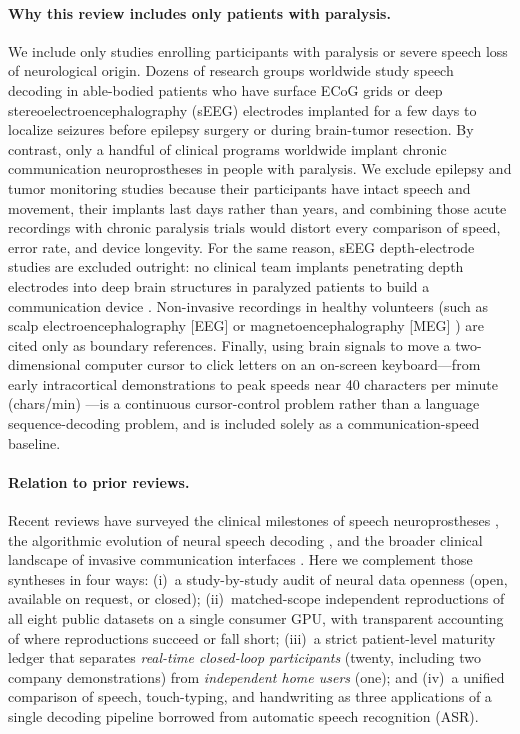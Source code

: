 \documentclass[11pt]{article}
\newcommand{\cpm}{chars/min}
\begin{document}
\paragraph{Why this review includes only patients with paralysis.} We
include only studies enrolling participants with paralysis or severe
speech loss of neurological origin. Dozens of research groups worldwide
study speech decoding in able-bodied patients who have surface ECoG
grids or deep stereoelectroencephalography (sEEG) electrodes implanted
for a few days to localize seizures before epilepsy surgery or during
brain-tumor resection. By contrast, only a handful of clinical programs
worldwide implant chronic communication neuroprostheses in people with
paralysis. We exclude epilepsy and tumor monitoring studies because
their participants have intact speech and movement, their implants last
days rather than years, and combining those acute recordings with
chronic paralysis trials would distort every comparison of speed, error
rate, and device longevity. For the same reason, sEEG depth-electrode
studies are excluded outright: no clinical team implants penetrating
depth electrodes into deep brain structures in paralyzed patients to
build a communication device \cite{fogg2026}. Non-invasive recordings in
healthy volunteers (such as scalp electroencephalography [EEG] or
magnetoencephalography [MEG] \cite{levy2026}) are cited only as boundary
references. Finally, using brain signals to move a two-dimensional
computer cursor to click letters on an on-screen keyboard---from early
intracortical demonstrations \cite{hochberg2006} to peak speeds near 40
characters per minute (\cpm{}) \cite{pandarinath2017}---is a continuous
cursor-control problem rather than a language sequence-decoding problem,
and is included solely as a communication-speed baseline.

\paragraph{Relation to prior reviews.} Recent reviews have surveyed the
clinical milestones of speech neuroprostheses \cite{silva2024review},
the algorithmic evolution of neural speech decoding \cite{stavisky2025},
and the broader clinical landscape of invasive communication interfaces
\cite{khan2025}. Here we complement those syntheses in four ways:
(i)~a study-by-study audit of neural data openness (open, available on
request, or closed); (ii)~matched-scope independent reproductions of all
eight public datasets on a single consumer GPU, with transparent
accounting of where reproductions succeed or fall short; (iii)~a strict
patient-level maturity ledger that separates \emph{real-time closed-loop
participants} (twenty, including two company demonstrations) from
\emph{independent home users} (one); and (iv)~a unified comparison of
speech, touch-typing, and handwriting as three applications of a single
decoding pipeline borrowed from automatic speech recognition (ASR).
\end{document}
